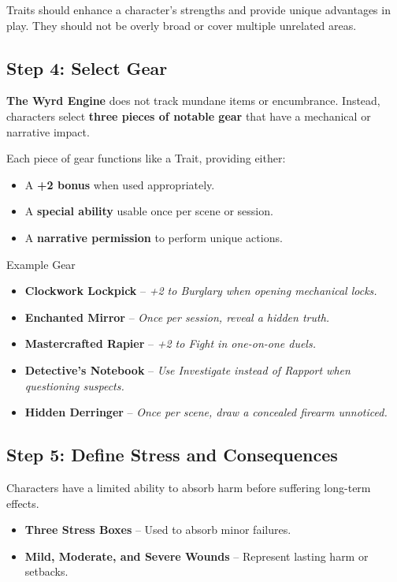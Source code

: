 Traits should enhance a character’s strengths and provide unique advantages in play. They should not be overly broad or cover multiple unrelated areas.

\subsection{Step 4: Select Gear}

\textbf{The Wyrd Engine} does not track mundane items or encumbrance. Instead, characters select \textbf{three pieces of notable gear} that have a mechanical or narrative impact.

Each piece of gear functions like a Trait, providing either:
\begin{itemize}
    \item A \textbf{+2 bonus} when used appropriately.
    \item A \textbf{special ability} usable once per scene or session.
    \item A \textbf{narrative permission} to perform unique actions.
\end{itemize}

\begin{DndSidebar}[float=!t]{Example Gear}
    \begin{itemize}
        \item \textbf{Clockwork Lockpick} – \emph{+2 to Burglary when opening mechanical locks.}
        \item \textbf{Enchanted Mirror} – \emph{Once per session, reveal a hidden truth.}
        \item \textbf{Mastercrafted Rapier} – \emph{+2 to Fight in one-on-one duels.}
        \item \textbf{Detective’s Notebook} – \emph{Use Investigate instead of Rapport when questioning suspects.}
        \item \textbf{Hidden Derringer} – \emph{Once per scene, draw a concealed firearm unnoticed.}
    \end{itemize}
\end{DndSidebar}

\subsection{Step 5: Define Stress and Consequences}

Characters have a limited ability to absorb harm before suffering long-term effects.

\begin{itemize}
    \item \textbf{Three Stress Boxes} – Used to absorb minor failures.
    \item \textbf{Mild, Moderate, and Severe Wounds} – Represent lasting harm or setbacks.
\end{itemize}

